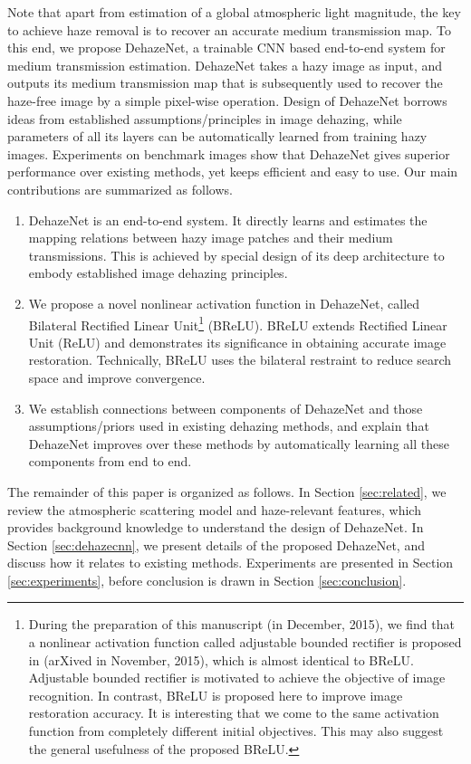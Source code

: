 \documentclass[journal]{IEEEtran}
\begin{document}
Note that apart from estimation of a global atmospheric light magnitude, the key to achieve haze removal is to recover an accurate medium transmission map. To this end, we propose DehazeNet, a trainable CNN based end-to-end system for medium transmission estimation. DehazeNet takes a hazy image as input, and outputs its medium transmission map that is subsequently used to recover the haze-free image by a simple pixel-wise operation. Design of DehazeNet borrows ideas from established assumptions/principles in image dehazing, while parameters of all its layers can be automatically learned from training hazy images. Experiments on benchmark images show that DehazeNet gives superior performance over existing methods, yet keeps efficient and easy to use. Our main contributions are summarized as follows.

\begin{enumerate}
\item DehazeNet is an end-to-end system. It directly learns and estimates the mapping relations between hazy image patches and their medium transmissions. This is achieved by special design of its deep architecture to embody established image dehazing principles.
\item We propose a novel nonlinear activation function in DehazeNet, called Bilateral Rectified Linear Unit\footnote{During the preparation of this manuscript (in December, 2015), we find that a nonlinear activation function called adjustable bounded rectifier is proposed in \cite{abr} (arXived in November, 2015), which is almost identical to BReLU. Adjustable bounded rectifier is motivated to achieve the objective of image recognition. In contrast, BReLU is proposed here to improve image restoration accuracy. It is interesting that we come to the same activation function from completely different initial objectives. This may also suggest the general usefulness of the proposed BReLU.} (BReLU). BReLU extends Rectified Linear Unit (ReLU) and demonstrates its significance in obtaining accurate image restoration. Technically, BReLU uses the bilateral restraint to reduce search space and improve convergence.
\item We establish connections between components of DehazeNet and those assumptions/priors used in existing dehazing methods, and explain that DehazeNet improves over these methods by automatically learning all these components from end to end.
\end{enumerate}

The remainder of this paper is organized as follows. In Section \ref{sec:related}, we review the atmospheric scattering model and haze-relevant features, which provides background knowledge to understand the design of DehazeNet. In Section \ref{sec:dehazecnn}, we present details of the proposed DehazeNet, and discuss how it relates to existing methods. Experiments are presented in Section \ref{sec:experiments}, before conclusion is drawn in Section \ref{sec:conclusion}.
\end{document}
